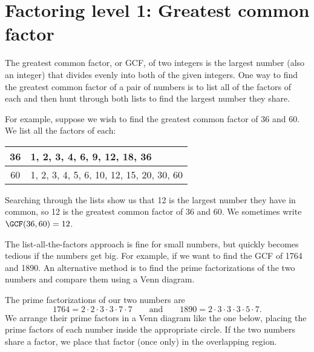 \section{Factoring level 1: Greatest common factor}
\label{sec:gcf}

The greatest common factor, or GCF, of two integers is the largest number (also an integer) that divides evenly into both of the given integers. One way to find the greatest common factor of a pair of numbers is to list all of the factors of each and then hunt through both lists to find the largest number they share.

For example, suppose we wish to find the greatest common factor of 36 and 60. We list all the factors of each:
\begin{table}
\begin{tabular}{c|l}
36 & 1, 2, 3, 4, 6, 9, 12, 18, 36\\\hline
60 & 1, 2, 3, 4, 5, 6, 10, 12, 15, 20, 30, 60
\end{tabular}
\end{table}
Searching through the lists show us that 12 is the largest number they have in common, so 12 is the greatest common factor of 36 and 60. We sometimes write $\GCF(36,60)=12$.

The list-all-the-factors approach is fine for small numbers, but quickly becomes tedious if the numbers get big. For example, if we want to find the GCF of 1764 and 1890. An alternative method is to find the prime factorizations of the two numbers and compare them using a Venn diagram.

The prime factorizations of our two numbers are
\[1764=2\cdot2\cdot3\cdot3\cdot7\cdot7 \qquad\text{and}\qquad 1890=2\cdot3\cdot3\cdot3\cdot5\cdot7.\] We arrange their prime factors in a Venn diagram like the one below, placing the prime factors of each number inside the appropriate circle. If the two numbers share a factor, we place that factor (once only) in the overlapping region.

\begin{figure}
\end{figure}

